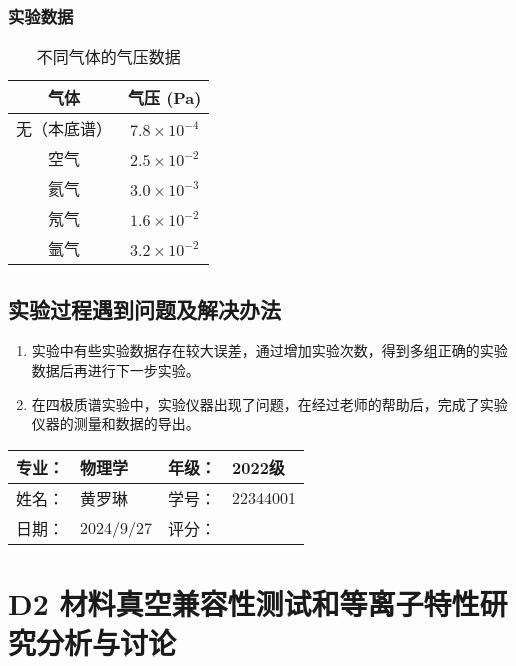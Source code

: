 \documentclass[dvipsnames, svgnames,a4paper,11pt]{article}
\begin{document}
\subsubsection{实验数据}
\begin{table}[H]
    \centering
    \begin{tabular}{|c|c|}
        \hline
        \textbf{气体} & \textbf{气压 (Pa)} \\ \hline
        无（本底谱） & $7.8 \times 10^{-4}$ \\ \hline
        空气        & $2.5 \times 10^{-2}$ \\ \hline
        氦气        & $3.0 \times 10^{-3}$ \\ \hline
        氖气        & $1.6 \times 10^{-2}$ \\ \hline
        氩气        & $3.2 \times 10^{-2}$ \\ \hline
    \end{tabular}
    \caption{不同气体的气压数据}
\end{table}
	\subsection{实验过程遇到问题及解决办法}
	\begin{enumerate}
		\item 实验中有些实验数据存在较大误差，通过增加实验次数，得到多组正确的实验数据后再进行下一步实验。
		\item 在四极质谱实验中，实验仪器出现了问题，在经过老师的帮助后，完成了实验仪器的测量和数据的导出。
	\end{enumerate}
	
	\clearpage
	
	\begin{table}
		\renewcommand\arraystretch{1.7}
		\begin{tabularx}{\textwidth}{|X|X|X|X|}
			\hline
			专业：& 物理学 &年级：& 2022级\\
			\hline
			姓名： &黄罗琳  & 学号：&22344001 \\
			\hline
			日期：& 2024/9/27 & 评分： & \\
			\hline
		\end{tabularx}
	\end{table}
	
	\section{ D2 材料真空兼容性测试和等离子特性研究\quad\heiti 分析与讨论}
	
\end{document}
